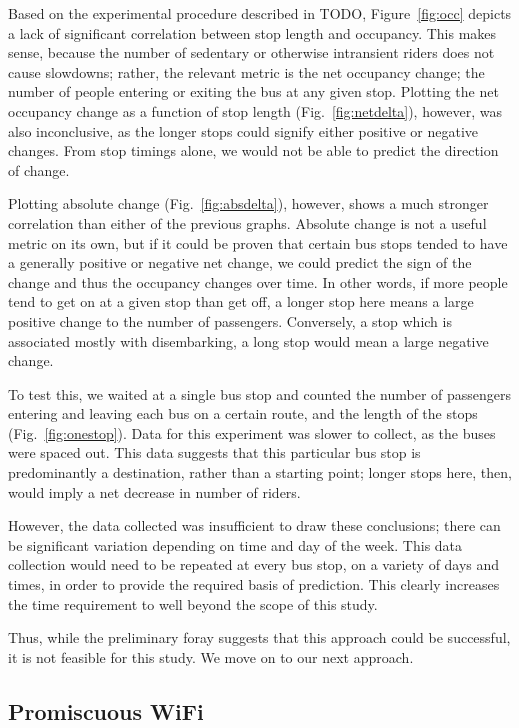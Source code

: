 Based on the experimental procedure described in TODO, Figure~\ref{fig:occ} depicts a lack of significant correlation between stop length and occupancy.
This makes sense, because the number of sedentary or otherwise intransient riders does not cause slowdowns; rather, the relevant metric is the net occupancy change; the number of people entering or exiting the bus at any given stop.
Plotting the net occupancy change as a function of stop length (Fig.~\ref{fig:netdelta}), however, was also inconclusive, as the longer stops could signify either positive or negative changes.
From stop timings alone, we would not be able to predict the direction of change.

Plotting absolute change (Fig.~\ref{fig:absdelta}), however, shows a much stronger correlation than either of the previous graphs.
Absolute change is not a useful metric on its own, but if it could be proven that certain bus stops tended to have a generally positive or negative net change, we could predict the sign of the change and thus the occupancy changes over time.
In other words, if more people tend to get on at a given stop than get off, a longer stop here means a large positive change to the number of passengers.
Conversely, a stop which is associated mostly with disembarking, a long stop would mean a large negative change.

To test this, we waited at a single bus stop and counted the number of passengers entering and leaving each bus on a certain route, and the length of the stops (Fig.~\ref{fig:onestop}).
Data for this experiment was slower to collect, as the buses were spaced out.
This data suggests that this particular bus stop is predominantly a destination, rather than a starting point; longer stops here, then, would imply a net decrease in number of riders.

However, the data collected was insufficient to draw these conclusions; there can be significant variation depending on time and day of the week.
This data collection would need to be repeated at every bus stop, on a variety of days and times, in order to provide the required basis of prediction.
This clearly increases the time requirement to well beyond the scope of this study.

Thus, while the preliminary foray suggests that this approach could be successful, it is not feasible for this study.
We move on to our next approach.

\subsection{Promiscuous WiFi}

